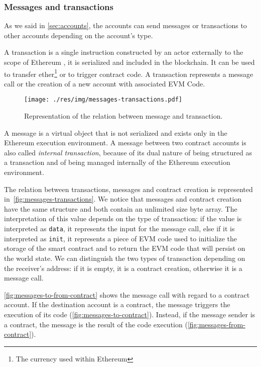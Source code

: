 \subsubsection{Messages and transactions}

As we said in \autoref{sec:accounts}, the accounts can send messages or
transactions to other accounts depending on the account's type.

A transaction is a single instruction constructed by an actor externally to the
scope of Ethereum \cite{wood2018ethereum}, it is serialized and included in the
blockchain. It can be used to transfer ether\footnote{The currency used within
Ethereum} or to trigger contract code. A transaction represents a message call
or the creation of a new account with associated EVM Code.

\begin{figure}[h]
  \centering
  \texttt{[image: ./res/img/messages-transactions.pdf]}
\caption{Representation of the relation between message and transaction.}
\label{fig:messages-transactions}
\end{figure}

A message is a virtual object that is not serialized and exists only in the
Ethereum execution environment. A message between two contract accounts is also
called \emph{internal transaction}, because of its dual nature of being
structured as a transaction and of being managed internally of the Ethereum
execution environment.

The relation between transactions, messages and contract creation is represented
in~\autoref{fig:messages-transactions}. We notice that messages and contract
creation have the same structure and both contain an unlimited size byte array.
The interpretation of this value depends on the type of transaction: if the
value is interpreted as \verb+data+, it represents the input for the message
call, else if it is interpreted as \verb|init|, it represents a piece of EVM
code used to initialize the storage of the smart contract and to return the EVM
code that will persist on the world state. We can distinguish the two types
of transaction depending on the receiver's address: if it is empty, it is a
contract creation, otherwise it is a message call.


\autoref{fig:messages-to-from-contract} shows the message call with regard to a
contract account. If the destination account is a contract, the message triggers
the execution of its code (\autoref{fig:messages-to-contract}). Instead, if the
message sender is a contract, the message is the result of the code execution
(\autoref{fig:messages-from-contract}).

